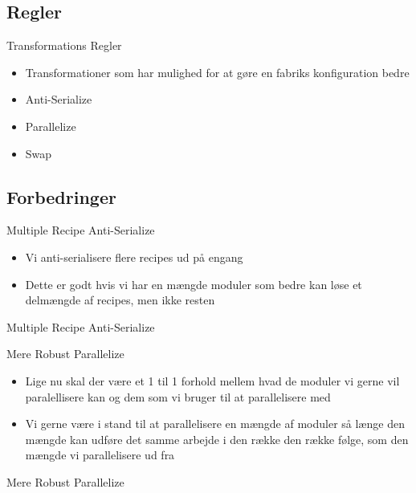 \subsection{Regler}
\begin{frame}{Transformations Regler}
	\begin{itemize}
		\item Transformationer som har mulighed for at gøre en fabriks konfiguration bedre
		\item Anti-Serialize
		\item Parallelize
		\item Swap		
	\end{itemize}
\end{frame}


\subsection{Forbedringer}
\begin{frame}{Multiple Recipe Anti-Serialize}
	\begin{itemize}
		\item Vi anti-serialisere flere recipes ud på engang
		\item Dette er godt hvis vi har en mængde moduler som bedre kan løse et delmængde af recipes, men ikke resten
	\end{itemize}
\end{frame}

\begin{frame} {Multiple Recipe Anti-Serialize}
\end{frame}

\begin{frame}{Mere Robust Parallelize}
	\begin{itemize}
		\item Lige nu skal der være et 1 til 1 forhold mellem hvad de moduler vi gerne vil paralellisere kan og dem som vi bruger til at parallelisere med
		\item Vi gerne være i stand til at parallelisere en mængde af moduler så længe den mængde kan udføre det samme arbejde i den række den række følge, som den mængde vi parallelisere ud fra
	\end{itemize}
\end{frame}

\begin{frame} {Mere Robust Parallelize}
\end{frame}

